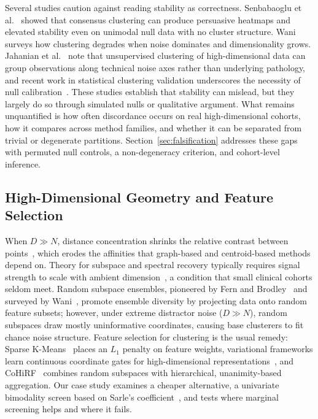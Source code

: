 \documentclass[pdflatex,sn-mathphys-num]{sn-jnl}
\theoremstyle{thmstyleone}
\theoremstyle{thmstyletwo}
\theoremstyle{thmstylethree}
\begin{document}
Several studies caution against reading stability as correctness. Senbabaoglu et al.~\cite{senbabaoglu2014critical} showed that consensus clustering can produce persuasive heatmaps and elevated stability even on unimodal null data with no cluster structure. Wani~\cite{wani2024comprehensive} surveys how clustering degrades when noise dominates and dimensionality grows. Jahanian et al.~\cite{jahanian2026highdim} note that unsupervised clustering of high-dimensional data can group observations along technical noise axes rather than underlying pathology, and recent work in statistical clustering validation underscores the necessity of null calibration~\cite{wang2026deep_jasa}. These studies establish that stability can mislead, but they largely do so through simulated nulls or qualitative argument. What remains unquantified is how often discordance occurs on real high-dimensional cohorts, how it compares across method families, and whether it can be separated from trivial or degenerate partitions. Section~\ref{sec:falsification} addresses these gaps with permuted null controls, a non-degeneracy criterion, and cohort-level inference.

\subsection{High-Dimensional Geometry and Feature Selection}\label{sec:rel_geometry}

When $D \gg N$, distance concentration shrinks the relative contrast between points~\cite{beyer1999nearest,peng2024interpreting}, which erodes the affinities that graph-based and centroid-based methods depend on. Theory for subspace and spectral recovery typically requires signal strength to scale with ambient dimension~\cite{zhang2024optimal}, a condition that small clinical cohorts seldom meet. Random subspace ensembles, pioneered by Fern and Brodley~\cite{fern2003random} and surveyed by Wani~\cite{wani2024comprehensive}, promote ensemble diversity by projecting data onto random feature subsets; however, under extreme distractor noise ($D \gg N$), random subspaces draw mostly uninformative coordinates, causing base clusterers to fit chance noise structure. Feature selection for clustering is the usual remedy: Sparse K-Means~\cite{witten2010framework} places an $L_1$ penalty on feature weights, variational frameworks learn continuous coordinate gates for high-dimensional representations~\cite{chen2026data}, and CoHiRF~\cite{belucci2025cohirf} combines random subspaces with hierarchical, unanimity-based aggregation. Our case study examines a cheaper alternative, a univariate bimodality screen based on Sarle's coefficient~\cite{sas1990stat}, and tests where marginal screening helps and where it fails.
\end{document}
